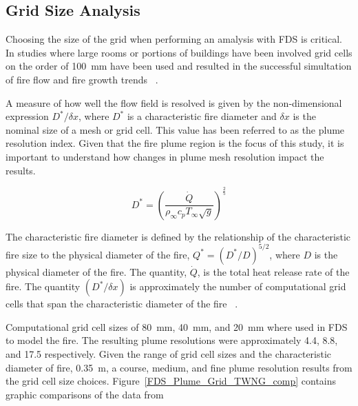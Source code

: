 \documentclass[twoside]{uocthesis}
\begin{document}
\subsection{Grid Size Analysis}

Choosing the size of the grid when performing an amalysis with FDS is critical. In studies where large rooms or portions of buildings have been involved grid cells on the order of 100~mm have been used and resulted in the successful simultation of fire flow and fire growth trends ~\cite{Grosshandler:Station,Vettori:2000,Barowy:2012,Overholt:San_Francisco,Weinschenk:Chicago}.

 A measure of how well the flow field is resolved is given by the non-dimensional expression ${D^*}/{\delta x}$, where $D^*$ is a characteristic fire diameter and $\delta x$ is the nominal size of a mesh or grid cell. This value has been referred to as the plume resolution index. Given that the fire plume region is the focus of this study, it is important to understand how changes in plume mesh resolution impact the results.    

\begin{equation}
 D^* = \left(
     \frac{\dot Q}{\rho_\infty  c_p  T_\infty  \sqrt{g} }
     \right)^\frac{2}{5} 
 \end{equation}


The characteristic fire diameter is defined by the relationship of the characteristic fire size to the physical diameter of the fire, ${Q^*} = ({D^*}/{D})^{5/2}$, where $D$ is the physical diameter of the fire. The quantity, $\dot Q$, is the total heat release rate of the fire. The quantity $({D^*}/{\delta x})$ is approximately the number of computational grid cells that span the characteristic diameter of the fire ~\cite{FDS_Users_Guide,FDS_Validation_Guide}.  

Computational grid cell sizes of 80~mm, 40~mm, and 20~mm where used in FDS to model the fire.  The resulting plume resolutions were approximately 4.4, 8.8, and 17.5 respectively. Given the range of grid cell sizes and the characteristic diameter of fire, 0.35~m, a course, medium, and fine plume resolution results from the grid cell size choices.  Figure~\ref{FDS_Plume_Grid_TWNG_comp} contains graphic comparisons of the data from   
\end{document}
